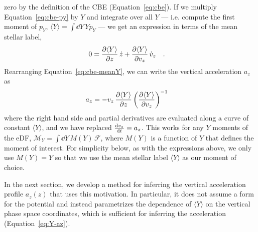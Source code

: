 \documentclass[modern]{aastex631}
\newcommand{\meanY}{\ensuremath{\langle Y \rangle}}
\begin{document}
zero by the definition of the CBE (Equation~\ref{eq:cbe}).
If we multiply Equation~\ref{eq:cbe-py} by $Y$ and integrate over all $Y$ --- i.e.
compute the first moment of $p_Y$, $\meanY = \int \dd{Y} \, Y p_Y$
--- we get an expression in terms of the mean stellar label,
\begin{align}
    0 &= \pderiv{\meanY}{z} \, \dot{z} +
        \pderiv{\meanY}{v_z} \, \dot{v}_z  \label{eq:cbe-meanY} \quad .
\end{align}
Rearranging Equation~\ref{eq:cbe-meanY}, we can write the vertical acceleration $a_z$ as
\begin{align}
    a_z &= - v_z \, \pderiv{\meanY}{z} \left(\pderiv{\meanY}{v_z}\right)^{-1}
    \label{eq:Y-az}
\end{align}
where the right hand side and partial derivatives are evaluated along a curve of
constant $\meanY$, and we have replaced $\frac{\mathrm{d}{v_z}}{\mathrm{d}{t}} = a_z$.
This works for any $Y$ moments of the eDF, $\mathcal{M}_Y = \int \dd{Y} \, M(Y) \,
\mathcal{F}$, where $M(Y)$ is a function of $Y$ that defines the moment of interest.
For simplicity below, as with the expressions above, we only use $M(Y) = Y$ so that we
use the mean stellar label $\meanY$ as our moment of choice.

In the next section, we develop a method for inferring the vertical acceleration profile
$a_z(z)$ that uses this motivation.
In particular, it does not assume a form for the potential and instead parametrizes the
dependence of $\meanY$ on the vertical phase space coordinates, which is sufficient for
inferring the acceleration (Equation~\ref{eq:Y-az}).

\end{document}
